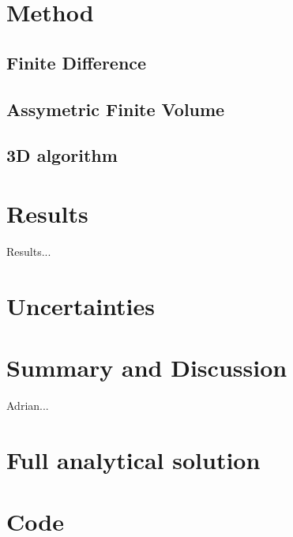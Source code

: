 \documentclass[aps,twocolumn,pre,nofootinbib]{revtex4}
\begin{document}
\section{Method \label{sec:met}}

 
\subsection{Finite Difference }


\subsection{Assymetric Finite Volume }


\subsection{3D algorithm}






\section{Results \label{sec:res}}


Results...


\section{Uncertainties \label{sec:unc}}




\section{Summary and Discussion \label{sec:sum}}


\begin{acknowledgments}
Adrian...
\end{acknowledgments}


\appendix*
\section{Full analytical solution}
\section{Code}
\end{document}
